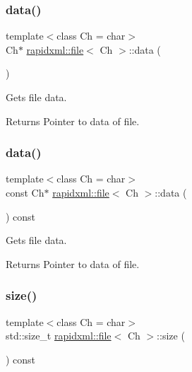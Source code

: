 \subsubsection{\texorpdfstring{data()}{data()}\hspace{0.1cm}{\footnotesize\ttfamily [1/2]}}
{\footnotesize\ttfamily template$<$class Ch  = char$>$ \\
Ch$\ast$ \mbox{\hyperlink{classrapidxml_1_1file}{rapidxml\+::file}}$<$ Ch $>$\+::data (\begin{DoxyParamCaption}{ }\end{DoxyParamCaption})\hspace{0.3cm}{\ttfamily [inline]}}

Gets file data. \begin{DoxyReturn}{Returns}
Pointer to data of file. 
\end{DoxyReturn}
\mbox{\label{classrapidxml_1_1file_a044bdd99e59157b8a5a1b28c2f32da4d}} 
\subsubsection{\texorpdfstring{data()}{data()}\hspace{0.1cm}{\footnotesize\ttfamily [2/2]}}
{\footnotesize\ttfamily template$<$class Ch  = char$>$ \\
const Ch$\ast$ \mbox{\hyperlink{classrapidxml_1_1file}{rapidxml\+::file}}$<$ Ch $>$\+::data (\begin{DoxyParamCaption}{ }\end{DoxyParamCaption}) const\hspace{0.3cm}{\ttfamily [inline]}}

Gets file data. \begin{DoxyReturn}{Returns}
Pointer to data of file. 
\end{DoxyReturn}
\mbox{\label{classrapidxml_1_1file_aacd451b3def3ad056fe8342dccee35cd}} 
\subsubsection{\texorpdfstring{size()}{size()}}
{\footnotesize\ttfamily template$<$class Ch  = char$>$ \\
std\+::size\+\_\+t \mbox{\hyperlink{classrapidxml_1_1file}{rapidxml\+::file}}$<$ Ch $>$\+::size (\begin{DoxyParamCaption}{ }\end{DoxyParamCaption}) const\hspace{0.3cm}{\ttfamily [inline]}}

